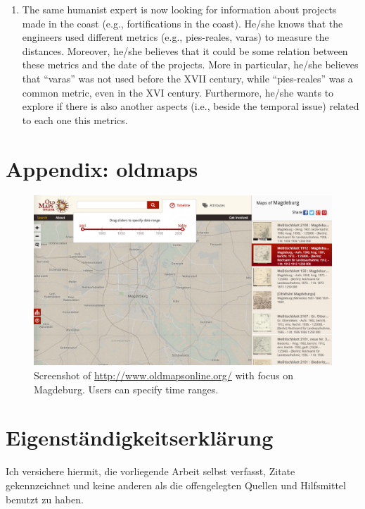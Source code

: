 \documentclass[11pt]{report}
\begin{document}
\begin{enumerate}
	\item The same humanist expert is now looking for information about projects made in the coast (e.g., fortifications in the coast). He/she knows that the engineers used different metrics (e.g., pies-reales, varas) to measure the distances. Moreover, he/she believes that it could be some relation between these metrics and the date of the projects. More in particular, he/she believes that ``varas'' was not used before the XVII century, while ``pies-reales'' was a common metric, even in the XVI century.
Furthermore, he/she wants to explore if there is also another aspects (i.e., beside the temporal issue) related to each one this metrics.
\end{enumerate}

\chapter{Appendix: oldmaps}
\label{app:oldmaps}

\begin{figure}[!ht]
	\centering
	\includegraphics[width=\linewidth]{images/oldmaps}
\caption{Screenshot of \url{http://www.oldmapsonline.org/} with focus on Magdeburg. Users can specify time ranges.}
\label{figure:oldmaps}
\end{figure}


\newpage

\chapter*{Eigenständigkeitserklärung}

Ich versichere hiermit, die vorliegende Arbeit selbst verfasst, Zitate gekennzeichnet und keine anderen als die offengelegten Quellen und Hilfsmittel benutzt zu haben.\\
\end{document}
